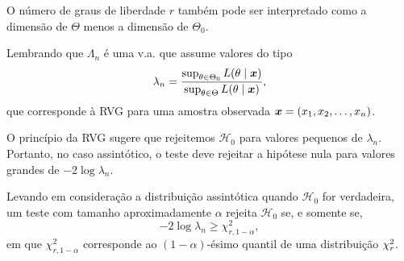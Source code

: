 \begin{note}
	\leavevmode
	\begin{outline}[enumerate]
		\1 O número de graus de liberdade $r$ também pode ser interpretado como a dimensão de $\Theta$ menos a dimensão de $\Theta_0$.
	\end{outline}
\end{note}

Lembrando que $\Lambda_n$ é uma v.a. que assume valores do tipo
\begin{equation}
\lambda_n=\frac{\sup_{\theta\in\Theta_0}L(\theta\mid\bm{x})}{\sup_{\theta\in\Theta}L(\theta\mid\bm{x})},
\end{equation}
que corresponde à RVG para uma amostra observada $\bm{x}=(x_1,x_2,\ldots,x_n)$.

O princípio da RVG sugere que rejeitemos $\mathcal{H}_0$ para valores pequenos de $\lambda_n$. Portanto, no caso assintótico, o teste deve rejeitar a hipótese nula para valores grandes de $-2\log\lambda_n$.

Levando em consideração a distribuição assintótica quando $\mathcal{H}_0$ for verdadeira, um teste com tamanho aproximadamente $\alpha$ rejeita $\mathcal{H}_0$ se, e somente se,
\begin{equation}
-2\log\lambda_n\geq\chi^2_{r,1-\alpha},
\end{equation}
em que $\chi^2_{r,1-\alpha}$ corresponde ao $(1-\alpha)$-ésimo quantil de uma distribuição $\chi^2_{r}$.

